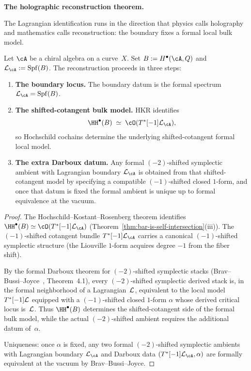 \bigskip

\noindent\textbf{The holographic reconstruction theorem.}


The Lagrangian identification runs in the direction that physics calls
holography and mathematics calls reconstruction: the boundary fixes a
formal local bulk model.

\begin{theorem}
\label{thm:holographic-reconstruction-conclusion}
Let $\cA$ be a chiral algebra on a curve~$X$. Set
$B := H^\bullet(\cA,Q)$ and $\cL_\cA := \operatorname{Spf}(B)$.
The reconstruction proceeds in three steps:
\begin{enumerate}[label=\textup{(\roman*)}]
\item \textbf{The boundary locus.}
 The boundary datum is the formal spectrum
 $\cL_\cA = \operatorname{Spf}(B)$.
\item \textbf{The shifted-cotangent bulk model.}
 HKR identifies
 \[
 \HH^\bullet(B)\;\simeq\;\cO(T^*[-1]\cL_\cA),
 \]
 so Hochschild cochains determine the underlying shifted-cotangent
 formal local model.
\item \textbf{The extra Darboux datum.}
 Any formal $(-2)$-shifted symplectic ambient with Lagrangian
 boundary $\cL_\cA$ is obtained from that shifted-cotangent model by
 specifying a compatible $(-1)$-shifted closed $1$-form, and once
 that datum is fixed the formal ambient is unique up to formal
 equivalence at the vacuum.
\end{enumerate}
\end{theorem}

\begin{proof}
The Hochschild--Kostant--Rosenberg theorem identifies
$\HH^\bullet(B) \simeq \cO(T^*[-1]\cL_\cA)$
\textup{(}Theorem~\textup{\ref{thm:bar-is-self-intersection}(iii)}\textup{)}. The
$(-1)$-shifted cotangent bundle $T^*[-1]\cL_\cA$ carries a
canonical $(-1)$-shifted symplectic structure (the Liouville
$1$-form acquires degree $-1$ from the fiber shift).

By the formal Darboux theorem for $(-2)$-shifted symplectic stacks
(Brav--Bussi--Joyce~\cite{BBJ19}, Theorem~4.1), every
$(-2)$-shifted symplectic derived stack is, in the formal
neighborhood of a Lagrangian~$\mathcal{L}$, equivalent to the local model
$T^*[-1]\mathcal{L}$ equipped with a $(-1)$-shifted closed $1$-form
$\alpha$ whose derived critical locus is~$\mathcal{L}$. Thus
$\HH^\bullet(B)$ determines the shifted-cotangent side of the formal
bulk model, while the actual $(-2)$-shifted ambient requires the
additional datum of~$\alpha$.

Uniqueness: once $\alpha$ is fixed, any two formal
$(-2)$-shifted symplectic ambients with Lagrangian boundary
$\cL_\cA$ and Darboux data $(T^*[-1]\cL_\cA,\alpha)$ are formally
equivalent at the vacuum by Brav--Bussi--Joyce.
\end{proof}

